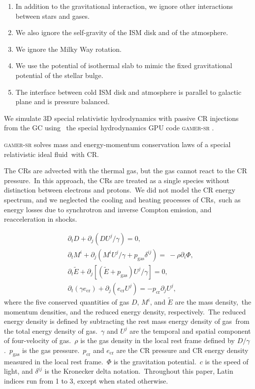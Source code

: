 \documentclass[twocolumn]{aastex631}
\begin{document}
\begin{enumerate}
\begin{enumerate}
      \item In addition to the gravitational interaction, we ignore other interactions between stars and gases.
      \item We also ignore the self-gravity of the ISM disk and of the atmosphere.
      \item We ignore the Milky Way rotation.
      \item We use the potential of isothermal slab to mimic the fixed gravitational potential of the stellar bulge.
      \item The interface between cold ISM disk and atmosphere is parallel to galactic plane and is pressure balanced.
    \end{enumerate}
\end{enumerate}
We simulate 3D special relativistic hydrodynamics with passive CR injections from the GC using \
the special hydrodynamics GPU code \textsc{gamer-sr} \citep{tseng2021}.

\textsc{gamer-sr} solves mass and energy-momentum conservation laws of a special relativistic ideal fluid\
with CR.

The CRs are advected with the thermal gas, but the gas cannot react to the CR pressure.\
In this approach, the CRs are treated as a single species without distinction between electrons and protons.\
We did not model the CR energy spectrum, and we neglected the cooling and heating processes of CRs,\
such as energy losses due to synchrotron and inverse Compton emission, and reacceleration in shocks.\

\begin{subequations}
  \label{conservative-form}
  \begin{align}
   &\partial_{t} D+\partial_{j} \left(DU^{j}/\gamma\right)=0,\label{D evolution}\\
   &\partial_{t} M^{i}+\partial_{j} \left(M^{i}U^{j}/\gamma+p_{\text{gas}}\delta^{ij}\right)=\
   -\rho\partial_{i}\Phi,\label{M evolution}\\
   &\partial_{t} \tilde{E}+\partial_j \left[\left(\tilde{E}+p_{\text{gas}}\right)U^{j}/\gamma\right]=0, \label{E evoltion}\\
   &\partial_{t} \left(\gamma e_{\text{cr}}\right) + \partial_{j} \left(e_{\text{cr}}U^{j}\right)=-p_{\text{cr}} \partial_{j} U^{j},\label{D evolution}
  \end{align}
\end{subequations}
where the five conserved quantities of gas $D$, $M^{i}$, and $\tilde{E}$ are the mass density,\
the momentum densities, and the reduced energy density, respectively.\
The reduced energy density is defined by subtracting the rest mass energy density of gas\
from the total energy density of gas.\
$\gamma$ and $U^{j}$ are the temporal and spatial component of four-velocity of gas.\
$\rho$ is the gas density in the local rest frame defined by $D/\gamma$.\
$p_{\text{gas}}$ is the gas pressure.\
$p_{\text{cr}}$ and $e_{\text{cr}}$ are the CR pressure and CR energy density measured in the local rest frame.\
$\Phi$ is the gravitation potential.\
$c$ is the speed of light, and $\delta^{ij}$ is the Kronecker delta notation.\
Throughout this paper, Latin indices run from 1 to 3, except when stated otherwise.
\end{document}
